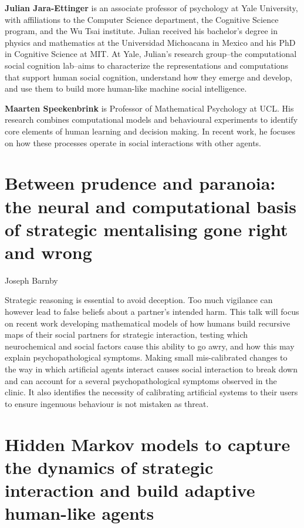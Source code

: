\documentclass[10pt, letterpaper]{article}
\begin{document}
\textbf{Julian Jara-Ettinger} is an associate professor of psychology at
Yale University, with affiliations to the Computer Science department,
the Cognitive Science program, and the Wu Tsai institute. Julian
received his bachelor's degree in physics and mathematics at the
Universidad Michoacana in Mexico and his PhD in Cognitive Science at
MIT. At Yale, Julian's research group--the computational social
cognition lab--aims to characterize the representations and computations
that support human social cognition, understand how they emerge and
develop, and use them to build more human-like machine social
intelligence.

\textbf{Maarten Speekenbrink} is Professor of Mathematical Psychology at
UCL. His research combines computational models and behavioural
experiments to identify core elements of human learning and decision
making. In recent work, he focuses on how these processes operate in
social interactions with other agents.

\hypertarget{between-prudence-and-paranoia-the-neural-and-computational-basis-of-strategic-mentalising-gone-right-and-wrong}{%
\section{Between prudence and paranoia: the neural and computational
basis of strategic mentalising gone right and
wrong}\label{between-prudence-and-paranoia-the-neural-and-computational-basis-of-strategic-mentalising-gone-right-and-wrong}}

\begin{center}
Joseph Barnby
\end{center}

Strategic reasoning is essential to avoid deception. Too much vigilance
can however lead to false beliefs about a partner's intended harm. This
talk will focus on recent work developing mathematical models of how
humans build recursive maps of their social partners for strategic
interaction, testing which neurochemical and social factors cause this
ability to go awry, and how this may explain psychopathological
symptoms. Making small mis-calibrated changes to the way in which
artificial agents interact causes social interaction to break down and
can account for a several psychopathological symptoms observed in the
clinic. It also identifies the necessity of calibrating artificial
systems to their users to ensure ingenuous behaviour is not mistaken as
threat.

\hypertarget{hidden-markov-models-to-capture-the-dynamics-of-strategic-interaction-and-build-adaptive-human-like-agents}{%
\section{Hidden Markov models to capture the dynamics of strategic
interaction and build adaptive human-like
agents}\label{hidden-markov-models-to-capture-the-dynamics-of-strategic-interaction-and-build-adaptive-human-like-agents}}
\end{document}

